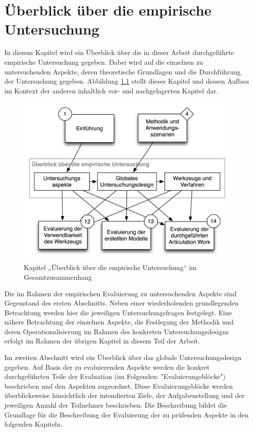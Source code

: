 

\chapter{Überblick über die empirische Untersuchung}
\label{cha:eval_ueberblick}

In diesem Kapitel wird ein Überblick über die in dieser Arbeit durchgeführte empirische Untersuchung gegeben. Dabei wird auf die einzelnen zu untersuchenden Aspekte, deren theoretische Grundlagen und die Durchführung der Untersuchung gegeben. Abbildung \ref{fig:img_Kontextgrafiken_k11} stellt dieses Kapitel und dessen Aufbau im Kontext der anderen inhaltlich vor- und nachgelagerten Kapitel dar.


\begin{figure}[htbp]
	\centering
		\includegraphics[scale=0.6]{img/Kontextgrafiken/k11.png}
	\caption{Kapitel „Überblick über die empirische Untersuchung“ im Gesamtzusammenhang}
	\label{fig:img_Kontextgrafiken_k11}
\end{figure}

Die im Rahmen der empirischen Evaluierung zu untersuchenden Aspekte sind Gegenstand des ersten Abschnitts. Neben einer wiederholenden grundlegenden Betrachtung werden hier die jeweiligen Untersuchungsfragen festgelegt. Eine nähere Betrachtung der einzelnen Aspekte, die Festlegung der Methodik und deren Operationalisierung im Rahmen des konkreten Untersuchungsdesigns erfolgt im Rahmen der übrigen Kapitel in diesem Teil der Arbeit.

Im zweiten Abschnitt wird ein Überblick über das globale Untersuchungsdesign gegeben. Auf Basis der zu evaluierenden Aspekte werden die konkret durchgeführten Teile der Evaluation (im Folgenden: "Evaluierungsblöcke") beschrieben und den Aspekten zugeordnet. Diese Evaluierungsblöcke werden überblicksweise hinsichtlich der intendierten Ziele, der Aufgabenstellung und der jeweiligen Anzahl der Teilnehmer beschrieben. Die Beschreibung bildet die Grundlage für die Beschreibung der Evaluierung der zu prüfenden Aspekte in den folgenden Kapiteln.


